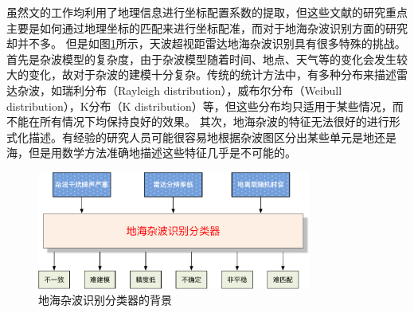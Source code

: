 虽然文\cite{weijers1995oth, fabrizio2016using, wheadon1994ionospheric, anderson1995auto, cuccoli2009over, cuccoli2009over2, cuccoli2010sea, cuccoli2011coordinate, cacciamano2012coordinate}的工作均利用了地理信息进行坐标配置系数的提取，但这些文献的研究重点主要是如何通过地理坐标的匹配来进行坐标配准，而对于地海杂波识别方面的研究却并不多。
但是如图\ref{fig:clutterproblem}所示，天波超视距雷达地海杂波识别具有很多特殊的挑战。首先是杂波模型的复杂度，由于杂波模型随着时间、地点、天气等的变化会发生较大的变化，故对于杂波的建模十分复杂。传统的统计方法中，有多种分布来描述雷达杂波，如瑞利分布（Rayleigh distribution），威布尔分布（Weibull distribution），K分布（K distribution）等，但这些分布均只适用于某些情况，而不能在所有情况下均保持良好的效果。
其次，地海杂波的特征无法很好的进行形式化描述。有经验的研究人员可能很容易地根据杂波图区分出某些单元是地还是海，但是用数学方法准确地描述这些特征几乎是不可能的。
\begin{figure}[hbt]
	\centering
	\includegraphics[width=9cm]{figures/othr/othr_classification.pdf}
	\caption{地海杂波识别分类器的背景}
	\label{fig:clutterproblem}
\end{figure}

